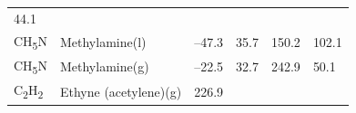 \documentclass[
]{book}
\theoremstyle{definition}
\theoremstyle{definition}
\theoremstyle{definition}
\theoremstyle{remark}
\begin{document}
\begin{longtable}[]{@{}llllll@{}}
\begin{minipage}[t]{0.14\columnwidth}
44.1\strut
\end{minipage}\tabularnewline
\begin{minipage}[t]{0.07\columnwidth}\raggedright
CH\textsubscript{5}N\strut
\end{minipage} & \begin{minipage}[t]{0.17\columnwidth}\raggedright
Methylamine(l)\strut
\end{minipage} & \begin{minipage}[t]{0.15\columnwidth}\raggedright
--47.3\strut
\end{minipage} & \begin{minipage}[t]{0.15\columnwidth}\raggedright
35.7\strut
\end{minipage} & \begin{minipage}[t]{0.14\columnwidth}\raggedright
150.2\strut
\end{minipage} & \begin{minipage}[t]{0.14\columnwidth}\raggedright
102.1\strut
\end{minipage}\tabularnewline
\begin{minipage}[t]{0.07\columnwidth}\raggedright
CH\textsubscript{5}N\strut
\end{minipage} & \begin{minipage}[t]{0.17\columnwidth}\raggedright
Methylamine(g)\strut
\end{minipage} & \begin{minipage}[t]{0.15\columnwidth}\raggedright
--22.5\strut
\end{minipage} & \begin{minipage}[t]{0.15\columnwidth}\raggedright
32.7\strut
\end{minipage} & \begin{minipage}[t]{0.14\columnwidth}\raggedright
242.9\strut
\end{minipage} & \begin{minipage}[t]{0.14\columnwidth}\raggedright
50.1\strut
\end{minipage}\tabularnewline
\begin{minipage}[t]{0.07\columnwidth}\raggedright
C\textsubscript{2}H\textsubscript{2}\strut
\end{minipage} & \begin{minipage}[t]{0.17\columnwidth}\raggedright
Ethyne (acetylene)(g)\strut
\end{minipage} & \begin{minipage}[t]{0.15\columnwidth}\raggedright
226.9\strut
\end{minipage} & \begin{minipage}[t]{0.15\columnwidth}\raggedright

\end{minipage}
\end{longtable}
\end{document}
